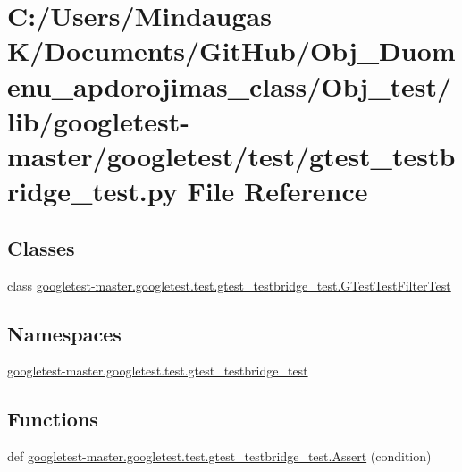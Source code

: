 \hypertarget{_obj__test_2lib_2googletest-master_2googletest_2test_2gtest__testbridge__test_8py}{}\section{C\+:/\+Users/\+Mindaugas K/\+Documents/\+Git\+Hub/\+Obj\+\_\+\+Duomenu\+\_\+apdorojimas\+\_\+class/\+Obj\+\_\+test/lib/googletest-\/master/googletest/test/gtest\+\_\+testbridge\+\_\+test.py File Reference}
\label{_obj__test_2lib_2googletest-master_2googletest_2test_2gtest__testbridge__test_8py}
\subsection*{Classes}
\begin{DoxyCompactItemize}
\item 
class \mbox{\hyperlink{classgoogletest-master_1_1googletest_1_1test_1_1gtest__testbridge__test_1_1_g_test_test_filter_test}{googletest-\/master.\+googletest.\+test.\+gtest\+\_\+testbridge\+\_\+test.\+G\+Test\+Test\+Filter\+Test}}
\end{DoxyCompactItemize}
\subsection*{Namespaces}
\begin{DoxyCompactItemize}
\item 
 \mbox{\hyperlink{namespacegoogletest-master_1_1googletest_1_1test_1_1gtest__testbridge__test}{googletest-\/master.\+googletest.\+test.\+gtest\+\_\+testbridge\+\_\+test}}
\end{DoxyCompactItemize}
\subsection*{Functions}
\begin{DoxyCompactItemize}
\item 
def \mbox{\hyperlink{namespacegoogletest-master_1_1googletest_1_1test_1_1gtest__testbridge__test_a79e562adf464d7b44d221a77f3e2ac7a}{googletest-\/master.\+googletest.\+test.\+gtest\+\_\+testbridge\+\_\+test.\+Assert}} (condition)
\end{DoxyCompactItemize}
